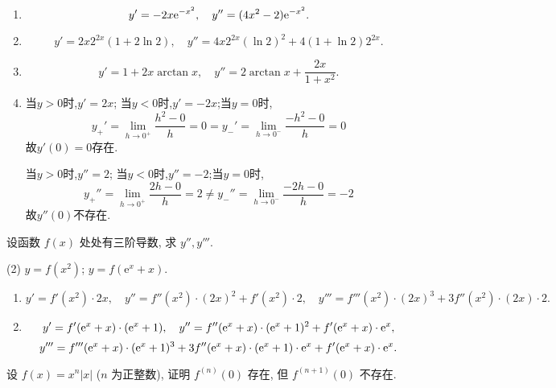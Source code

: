 \begin{solution}
    \begin{enumerate}
        \item $$y' = -2x \mathrm{e}^{-x^2}, \quad y'' = (4x^2 - 2) \mathrm{e}^{-x^2}.$$
        \item $$y' = 2x 2^{2x} (1 + 2 \ln 2), \quad y'' = 4x 2^{2x} (\ln 2)^2 + 4(1 + \ln 2) 2^{2x}.$$
        \item $$y' = 1 + 2x \arctan x, \quad y'' = 2 \arctan x + \frac{2x}{1+x^2}.$$
        \item 当$y > 0$时,$y' = 2x$; 当$y < 0$时,$y' = -2x$;当$y = 0$时,
              $$y_+' = \lim_{h \to 0^+} \frac{h^2 - 0}{h} = 0 = y_-' = \lim_{h \to 0^-} \frac{-h^2 - 0}{h} = 0 $$故$y'(0)=0$存在.

              当$y > 0$时,$y'' = 2$; 当$y < 0$时,$y'' = -2$;当$y = 0$时,
              $$y_+'' = \lim_{h \to 0^+} \frac{2h - 0}{h} = 2 \neq y_-'' = \lim_{h \to 0^-} \frac{-2h - 0}{h} = -2 $$故$y''(0)$不存在.
    \end{enumerate}
\end{solution}

\begin{exercise}[3.1.19]
    设函数 $f(x)$ 处处有三阶导数, 求 $y'', y'''$.
    \begin{tasks}[label=(\arabic*)](2)
        \task $y=f(x^2)$;
        \task $y=f(\mathrm{e}^x+x)$.
    \end{tasks}
\end{exercise}

\begin{solution}
    \begin{enumerate}
        \item $$y' = f'(x^2) \cdot 2x, \quad y'' = f''(x^2) \cdot (2x)^2 + f'(x^2) \cdot 2, \quad y''' = f'''(x^2) \cdot (2x)^3 + 3 f''(x^2) \cdot (2x) \cdot 2.$$
        \item $$y' = f'(\mathrm{e}^x + x) \cdot (\mathrm{e}^x + 1), \quad y'' = f''(\mathrm{e}^x + x) \cdot (\mathrm{e}^x + 1)^2 + f'(\mathrm{e}^x + x) \cdot \mathrm{e}^x,$$
              $$y''' = f'''(\mathrm{e}^x + x) \cdot (\mathrm{e}^x + 1)^3 + 3 f''(\mathrm{e}^x + x) \cdot (\mathrm{e}^x + 1) \cdot \mathrm{e}^x + f'(\mathrm{e}^x + x) \cdot \mathrm{e}^x.$$
    \end{enumerate}
\end{solution}

\begin{exercise}[3.1.20]
    设 $f(x)=x^n|x|$ ($n$ 为正整数), 证明 $f^{(n)}(0)$ 存在, 但 $f^{(n+1)}(0)$ 不存在.
\end{exercise}

